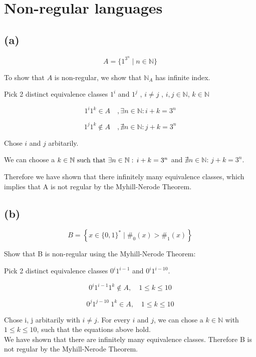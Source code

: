 


\setcounter{section}{1}

\section{Non-regular languages}

\subsection{(a)}
\[
A = \{1^{3^n} \mid n \in \mathbb{N}\}
\]

To show that \( A \) is non-regular, we show that \( \mathbb{N}_A \) has infinite index.

Pick 2 distinct equivalence classes \(1^i\) and \(1^j\) , \( i \neq j \) , \( i, j \in \mathbb{N} \), \( k \in \mathbb{N} \)

\[
1^i 1^k \in A  \quad  , \exists n \in \mathbb{N}:i + k = 3^n
\]

\[
1^j 1^k \notin A  \quad  , \nexists n \in \mathbb{N}:j + k = 3^n
\]

Chose $i$ and $j$ arbitarily.

We can choose a $k \in \mathbb{N} \) such that \( \exists  n \in \mathbb{N}: \, i + k = 3^n$ and $\nexists  n \in \mathbb{N}: \, j + k = 3^n$. 

Therefore we have shown that there infinitely many equivalence classes, which implies that A is not regular by the Myhill-Nerode Theorem.

\vspace{20pt}

\subsection{(b)}
 \[
B = \left\{ x \in \{ 0, 1 \}^* \mid \#_0(x) > \#_1(x) \right\} 
\]

Show that B is non-regular using the Myhill-Nerode Theorem:

Pick 2 distinct equivalence classes $0^i 1^{i-1}$ and $0^i 1^{i-10}$.

\[
0^i 1^{i-1} 1^k \notin A , \quad 1 \leq k \leq 10
\]

\[
0^j 1^{j-10}\ 1^k \in A, \quad 1 \leq k \leq 10
\]

Chose i, j arbitarily with \( i \neq j \). For every $i$ and $j$, we can chose a $k \in \mathbb{N}$ with $1 \leq k \leq 10$, such that the equations above hold.\\
We have shown that there are infinitely many equivalence classes. Therefore B is not regular by the Myhill-Nerode Theorem.






         




